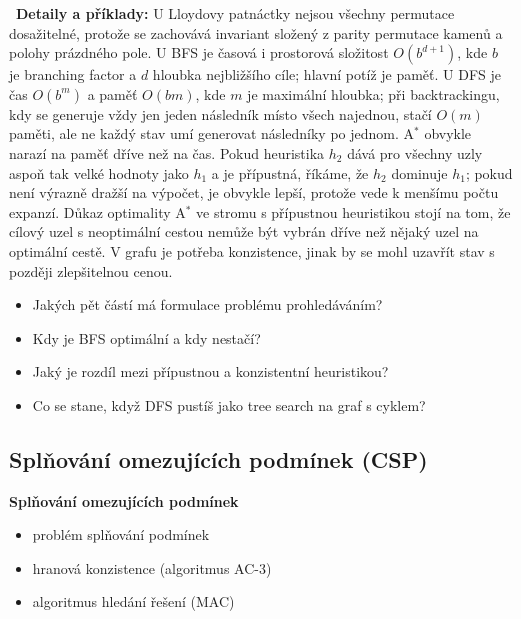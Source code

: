 \begin{odpoved}
\noindent{}\ \textbf{Detaily a příklady:} U Lloydovy patnáctky nejsou všechny permutace dosažitelné, protože se zachovává invariant složený z parity permutace kamenů a polohy prázdného pole. U BFS je časová i prostorová složitost $O(b^{d+1})$, kde $b$ je branching factor a $d$ hloubka nejbližšího cíle; hlavní potíž je paměť. U DFS je čas $O(b^m)$ a paměť $O(bm)$, kde $m$ je maximální hloubka; při backtrackingu, kdy se generuje vždy jen jeden následník místo všech najednou, stačí $O(m)$ paměti, ale ne každý stav umí generovat následníky po jednom. A$^*$ obvykle narazí na paměť dříve než na čas. Pokud heuristika $h_2$ dává pro všechny uzly aspoň tak velké hodnoty jako $h_1$ a je přípustná, říkáme, že $h_2$ dominuje $h_1$; pokud není výrazně dražší na výpočet, je obvykle lepší, protože vede k menšímu počtu expanzí. Důkaz optimality A$^*$ ve stromu s přípustnou heuristikou stojí na tom, že cílový uzel s neoptimální cestou nemůže být vybrán dříve než nějaký uzel na optimální cestě. V grafu je potřeba konzistence, jinak by se mohl uzavřít stav s později zlepšitelnou cenou.
\end{odpoved}

\begin{recall}
\begin{itemize}[leftmargin=1.2em,itemsep=0pt,topsep=1pt]
  \item Jakých pět částí má formulace problému prohledáváním?
  \item Kdy je BFS optimální a kdy nestačí?
  \item Jaký je rozdíl mezi přípustnou a konzistentní heuristikou?
  \item Co se stane, když DFS pustíš jako tree search na graf s cyklem?
\end{itemize}
\end{recall}

\subsection{Splňování omezujících podmínek (CSP)}

\begin{tema}
\textbf{Splňování omezujících podmínek}
\begin{itemize}[leftmargin=1.2em,itemsep=0pt,topsep=1pt]
  \item problém splňování podmínek
  \item hranová konzistence (algoritmus AC-3)
  \item algoritmus hledání řešení (MAC)
\end{itemize}
\end{tema}
\begin{vezkratce}
\end{vezkratce}

